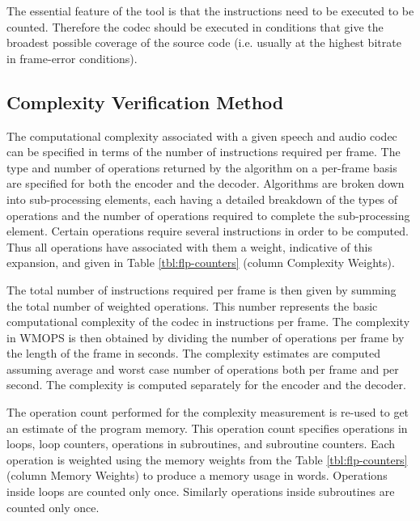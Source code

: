 The essential feature of the tool is that the instructions need to be 
executed to be counted. Therefore the codec should be executed in 
conditions that give the broadest possible coverage of the source code 
(i.e. usually at the highest bitrate in frame-error conditions).

\subsection{Complexity Verification Method}
The computational complexity associated with a given speech and audio 
codec can be specified in terms of the number of instructions required 
per frame. The type and number of operations returned by the algorithm 
on a per-frame basis are specified for both the encoder and the 
decoder. Algorithms are broken down into sub-processing elements, each 
having a detailed breakdown of the types of operations and the number 
of operations required to complete the sub-processing element. Certain 
operations require several instructions in order to be computed. Thus 
all operations have associated with them a weight, indicative of this 
expansion, and given in Table \ref{tbl:flp-counters} (column 
Complexity Weights).

The total number of instructions required per frame is then given by 
summing the total number of weighted operations. This number represents 
the basic computational complexity of the codec in instructions per 
frame. The complexity in WMOPS is then obtained by dividing the number 
of operations per frame by the length of the frame in seconds. The 
complexity estimates are computed assuming average and worst case 
number of operations both per frame and per second. The complexity 
is computed separately for the encoder and the decoder.

The operation count performed for the complexity measurement is re-used 
to get an estimate of the program memory. This operation count specifies 
operations in loops, loop counters, operations in subroutines, and 
subroutine counters. Each operation is weighted using the memory weights 
from the Table \ref{tbl:flp-counters} (column Memory Weights) to produce 
a memory usage in words. Operations inside loops are counted only once. 
Similarly operations inside subroutines are counted only once.

